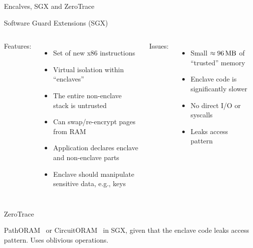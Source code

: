 	\begin{frame}{Encalves, SGX and ZeroTrace}

		\begin{block}{Software Guard Extensions (SGX)~\cite{sgx-1, sgx-2, sgx-3, sgx-manual, sgx-explained}}
			\justify%

			\vspace*{1ex}

			\begin{columns}[T,onlytextwidth]

					Features:
					\begin{itemize}
						\item Set of new x86 instructions
						\item Virtual isolation within ``enclaves''
						\item The entire non-enclave stack is untrusted
						\item Can swap/re-encrypt pages from RAM
						\item Application declares enclave and non-enclave parts
						\item Enclave should manipulate sensitive data, e.g., keys
					\end{itemize}


					Issues:
					\begin{itemize}
						\item Small $\approx \SI{96}{\mega\byte}$ of ``trusted'' memory
						\item Enclave code is significantly slower
						\item No direct I/O or syscalls
						\item \alert{Leaks access pattern}
					\end{itemize}

			\end{columns}

		\end{block}

		\vspace*{1ex}

		\begin{block}{ZeroTrace~\cite{zerotrace}}
			\justify%

			PathORAM~\cite{path-oram} or CircuitORAM~\cite{circuit-oram} in SGX, given that the enclave code leaks access pattern. Uses oblivious operations.

		\end{block}

	\end{frame}


